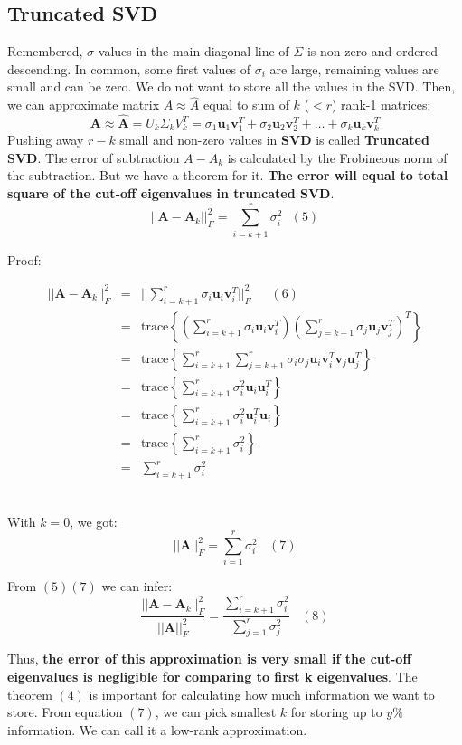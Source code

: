 \documentclass[a4paper, 12pt]{report}
\begin{document}
\subsection{Truncated SVD}
\indent \par Remembered, $\sigma$ values in the main diagonal line of $\Sigma$ is non-zero and ordered descending. In common, some first values of $\sigma_i$ are large, remaining values are small and can be zero. We do not want to store all the values in the SVD. Then, we can approximate matrix  $A \approx \hat{A} $ equal to sum of $k$ ($< r$) rank-1 matrices:
$$\mathbf{A} \approx \mathbf{\hat{A} } = U_k \Sigma_k V_k^T = \sigma_1 \mathbf{u}_1 \mathbf{v}^T_1 + \sigma_2\mathbf{u}_2\mathbf{v}_2^T + \dots + \sigma_k\mathbf{u}_k\mathbf{v}_k^T $$
Pushing away $r-k$ small and non-zero values in \textbf{SVD} is called \textbf{Truncated SVD}. The error of subtraction $A-A_k$ is calculated by the Frobineous norm of the subtraction. But we have a theorem for it. \textbf{The error will equal to total square of the cut-off eigenvalues in truncated SVD}.
$$||\mathbf{A} - \mathbf{A}_k||_F^2 = \sum_{i = k + 1}^r \sigma_i^2 ~~~(5)$$
\indent\par Proof:
\indent\par\begin{eqnarray*}
    ||\mathbf{A} - \mathbf{A}_k||_F^2 &=& ||\sum_{i = k + 1}^r \sigma_i \mathbf{u}_i\mathbf{v}_i^T ||_F^2  ~~~~~~~ (6) \\
    &=& \text{trace}\left\{ \left(\sum_{i = k + 1}^r \sigma_i \mathbf{u}_i\mathbf{v}_i^T\right)
    \left(\sum_{j = k + 1}^r \sigma_j \mathbf{u}_j\mathbf{v}_j^T\right)^T
    \right\}  \\
    &=& \text{trace}\left\{ \sum_{i = k + 1}^r \sum_{j = k + 1}^r \sigma_i\sigma_j \mathbf{u}_i\mathbf{v}_i^T \mathbf{v}_j \mathbf{u}_j^T
    \right\}  \\
    &=& \text{trace}\left\{ \sum_{i = k + 1}^r  \sigma_i^2\mathbf{u}_i\mathbf{u}_i^T
    \right\}  \\
    &=& \text{trace}\left\{ \sum_{i = k + 1}^r  \sigma_i^2\mathbf{u}_i^T\mathbf{u}_i
    \right\}   \\
    &=& \text{trace}\left\{ \sum_{i = k + 1}^r  \sigma_i^2
    \right\}   \\
    & =& \sum_{i = k + 1}^r \sigma_i^2 
\end{eqnarray*}\\
\indent \par With $k=0$, we got: 
$$ ||\mathbf{A}||_F^2 = \sum_{i = 1}^r \sigma_i^2~~~~ (7) $$
\indent \par  From $(5)(7)$ we can infer:
$$ \frac{||\mathbf{A} - \mathbf{A}_k||_F^2}{||\mathbf{A}||_F^2} = {\frac{\sum_{i = k + 1}^r \sigma_i^2}{\sum_{j = 1}^r \sigma_j^2}} ~~~~ (8)$$
\indent \par  Thus, \textbf{the error of this approximation is very small if the cut-off eigenvalues is negligible for comparing to first k eigenvalues}. The theorem $(4)$ is important for calculating how much information we want to store. From equation $(7)$, we can pick smallest $k$ for storing up to $y \% $ information. We can call it a low-rank approximation.\\
\end{document}
